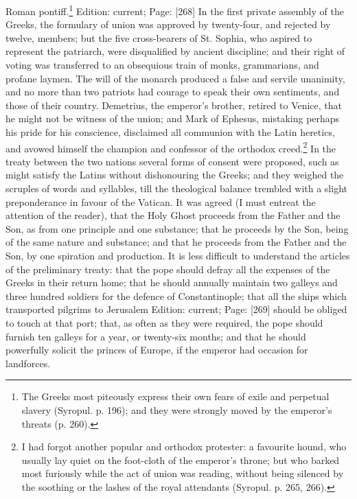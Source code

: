 Roman pontiff.\footnote{The Greeks most piteously express their own fears of exile and perpetual slavery (Syropul. p. 196); and they were strongly moved by the emperor\texthebrew{}’s threats (p. 260).} Edition: current; Page: [268] In the first private assembly of the Greeks, the formulary of union was approved by twenty-four, and rejected by twelve, members; but the five cross-bearers of St. Sophia, who aspired to represent the patriarch, were disqualified by ancient discipline; and their right of voting was transferred to an obsequious train of monks, grammarians, and profane laymen. The will of the monarch produced a false and servile unanimity, and no more than two patriots had courage to speak their own sentiments, and those of their country. Demetrius, the emperor\texthebrew{}’s brother, retired to Venice, that he might not be witness of the union; and Mark of Ephesus, mistaking perhaps his pride for his conscience, disclaimed all communion with the Latin heretics, and avowed himself the champion and confessor of the orthodox creed.\footnote{I had forgot another popular and orthodox protester: a favourite hound, who usually lay quiet on the foot-cloth of the emperor\texthebrew{}’s throne; but who barked most furiously while the act of union was reading, without being silenced by the soothing or the lashes of the royal attendants (Syropul. p. 265, 266).} In the treaty between the two nations several forms of consent were proposed, such as might satisfy the Latins without dishonouring the Greeks; and they weighed the scruples of words and syllables, till the theological balance trembled with a slight preponderance in favour of the Vatican. It was agreed (I must entreat the attention of the reader), that the Holy Ghost proceeds from the Father and the Son, as from one principle and one substance; that he proceeds by the Son, being of the same nature and substance; and that he proceeds from the Father and the Son, by one spiration and production. It is less difficult to understand the articles of the preliminary treaty: that the pope should defray all the expenses of the Greeks in their return home; that he should annually maintain two galleys and three hundred soldiers for the defence of Constantinople; that all the ships which transported pilgrims to Jerusalem Edition: current; Page: [269] should be obliged to touch at that port; that, as often as they were required, the pope should furnish ten galleys for a year, or twenty-six months; and that he should powerfully solicit the princes of Europe, if the emperor had occasion for landforces.


